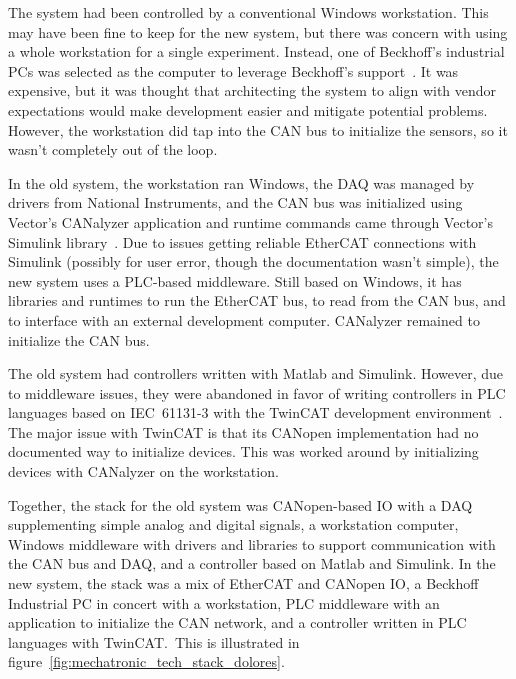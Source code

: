 \documentclass[english,12pt,a4paper,pdftex,eng,utf8]{aaltothesis}
\begin{document}
The system had been controlled by a conventional Windows workstation. This may have been fine to keep for the new system, but there was concern with using a whole workstation for a single experiment. Instead, one of Beckhoff's industrial PCs was selected as the computer to leverage Beckhoff's support~\cite{BeckhoffC60XX}. It was expensive, but it was thought that architecting the system to align with vendor expectations would make development easier and mitigate potential problems. However, the workstation did tap into the CAN bus to initialize the sensors, so it wasn't completely out of the loop.

In the old system, the workstation ran Windows, the DAQ was managed by drivers from National Instruments, and the CAN bus was initialized using Vector's CANalyzer application and runtime commands came through Vector's Simulink library~\cite{VectorCanalyzer, SimulinkVectorCAN}. Due to issues getting reliable EtherCAT connections with Simulink (possibly for user error, though the documentation wasn't simple), the new system uses a PLC-based middleware. Still based on Windows, it has libraries and runtimes to run the EtherCAT bus, to read from the CAN bus, and to interface with an external development computer. CANalyzer remained to initialize the CAN bus.

The old system had controllers written with Matlab and Simulink. However, due to middleware issues, they were abandoned in favor of writing controllers in PLC languages based on IEC~61131-3 with the TwinCAT development environment~\cite{IEC61131-3, BeckhoffTwinCAT}. The major issue with TwinCAT is that its CANopen implementation had no documented way to initialize devices. This was worked around by initializing devices with CANalyzer on the workstation.

Together, the stack for the old system was CANopen-based IO with a DAQ supplementing simple analog and digital signals, a workstation computer, Windows middleware with drivers and libraries to support communication with the CAN bus and DAQ, and a controller based on Matlab and Simulink. In the new system, the stack was a mix of EtherCAT and CANopen IO, a Beckhoff Industrial PC in concert with a workstation, PLC middleware with an application to initialize the CAN network, and a controller written in PLC languages with TwinCAT.\ This is illustrated in figure~\ref{fig:mechatronic_tech_stack_dolores}.
\end{document}

